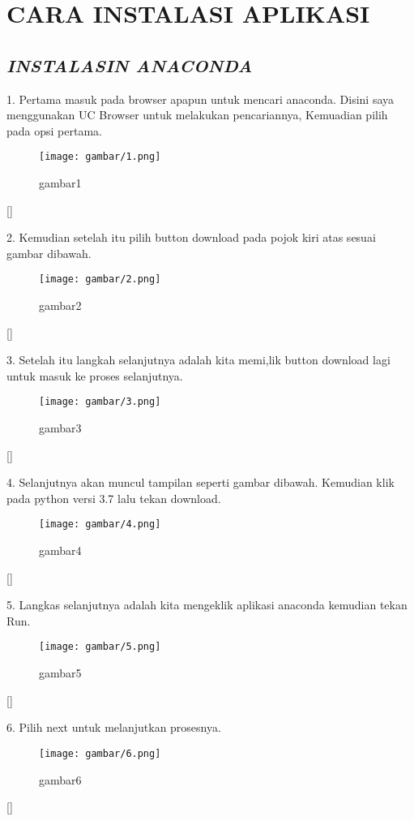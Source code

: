 \chapter*{CARA INSTALASI APLIKASI}
\section*{\textit{INSTALASIN ANACONDA}}
\item 1.  Pertama masuk  pada browser apapun untuk mencari anaconda. Disini saya menggunakan UC Browser untuk melakukan pencariannya, Kemuadian pilih pada opsi pertama.
\begin{figure}[h]
    \centering
    \texttt{[image: gambar/1.png]}
    \caption{gambar1}
    \label{fig:my_label}
\end{figure}[]
\item 2. Kemudian  setelah itu pilih button download pada pojok kiri atas sesuai gambar dibawah.
\begin{figure}[h]
    \centering
    \texttt{[image: gambar/2.png]}
    \caption{gambar2}
    \label{fig:my_label}
\end{figure}[]
\item 3.  Setelah itu langkah selanjutnya adalah  kita memi,lik button download lagi untuk masuk ke proses selanjutnya.
\begin{figure}[h]
    \centering
    \texttt{[image: gambar/3.png]}
    \caption{gambar3}
    \label{fig:my_label}
\end{figure}[]
\item 4.  Selanjutnya akan muncul tampilan seperti gambar dibawah. Kemudian klik pada python  versi 3.7 lalu tekan download.
\begin{figure}[h]
    \centering
    \texttt{[image: gambar/4.png]}
    \caption{gambar4}
    \label{fig:my_label}
\end{figure}[]
\item 5.  Langkas selanjutnya adalah kita mengeklik aplikasi anaconda kemudian tekan Run.
\begin{figure}[h]
    \centering
    \texttt{[image: gambar/5.png]}
    \caption{gambar5}
    \label{fig:my_label}
\end{figure}[]
\item 6.  Pilih next untuk melanjutkan prosesnya.
\begin{figure}[h]
    \centering
    \texttt{[image: gambar/6.png]}
    \caption{gambar6}
    \label{fig:my_label}
\end{figure}[]

